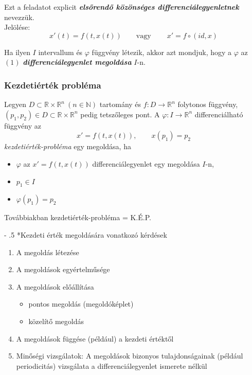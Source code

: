 \documentclass[12pt,margin=0px]{article}
\makeatletter
\renewcommand\paragraph{%
	\@startsection{paragraph}{4}{0mm}%
	{-\baselineskip}%
	{.5\baselineskip}%
	{\normalfont\normalsize\bfseries}}
\makeatother
\begin{document}
    \noindent Ezt a feladatot explicit \textbf{\emph{elsőrendő közönséges differenciálegyenletnek}} nevezzük.\\


    \noindent Jelölése:
    \begin{equation} \label{eu_eq1}
        x'(t) = f(t, x(t)) \qquad \text{vagy}\ \qquad x' = f \circ (id, x)
    \end{equation}

    \noindent Ha ilyen $I$ intervallum és $\varphi$ függvény létezik, akkor azt mondjuk, hogy a $\varphi$ az $(1)$ \textbf{\emph{differenciálegyenlet megoldása}} $I$-n.
\newpage
    \subsubsection*{Kezdetiérték probléma}

    Legyen $D \subset \mathbb{R} \times \mathbb{R}^{n}\ (n \in \mathbb{N})$ tartomány és $f:D \to \mathbb{R}^{n}$ folytonos függvény, $(p_1, p_2) \in D \subset \mathbb{R} \times \mathbb{R}^{n}$ pedig tetszőleges pont. A $\varphi: I \to \mathbb{R}^n$ differenciálható függvény az
    \begin{equation} \label{eu_eq2}
        x' = f(t, x(t)), \qquad x(p_1) = p_2
    \end{equation}
    \emph{kezdetiérték-probléma} egy megoldása, ha
    \begin{itemize}
      \item $\varphi$ az $x' = f(t, x(t))$ differenciálegyenlet egy megoldása $I$-n,
      \item $p_1 \in I$
      \item $\varphi(p_1) = p_2$
    \end{itemize}

    \noindent Továbbiakban kezdetiérték-probléma = K.É.P.

    \paragraph*{Kezdeti érték megoldására vonatkozó kérdések}

    \begin{enumerate}
      \item A megoldás létezése
      \item A megoldások egyértelműsége
      \item A megoldások előállítása
      \begin{itemize}
        \item pontos megoldás (megoldóképlet)
        \item közelítő megoldás
      \end{itemize}
      \item A megoldások függése (például) a kezdeti értéktől
      \item Minőségi vizsgálatok: A megoldások bizonyos tulajdonságainak (például periodicitás) vizsgálata a differenciálegyenlet ismerete nélkül
    \end{enumerate}
\end{document}
